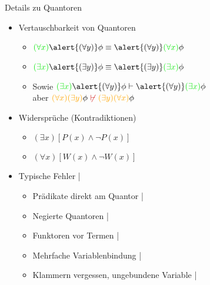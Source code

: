 \begin{frame}
  {Details zu Quantoren}
  \onslide<+->
  \begin{itemize}[<+->]
    \item Vertauschbarkeit von Quantoren
      \begin{itemize}[<+->]
        \item $\gruen{(\forall x)}\alert{(\forall y)}\phi\equiv\alert{(\forall y)}\gruen{(\forall x)}\phi$
          \Viertelzeile
        \item $\gruen{(\exists x)}\alert{(\exists y)}\phi\equiv\alert{(\exists y)}\gruen{(\exists x)}\phi$
          \Viertelzeile
        \item Sowie $\gruen{(\exists x)}\alert{(\forall y)}\phi \vdash\alert{(\forall y)}\gruen{(\exists x)}\phi$\\
          aber $\orongsch{(\forall x)(\exists y)}\phi\ \rot{\not\vdash}\ \orongsch{(\exists y)(\forall x)}\phi$
      \end{itemize}
      \Halbzeile
    \item Widersprüche (Kontradiktionen)
      \begin{itemize}[<+->]
        \item $(\exists x)[P(x)\wedge\neg P(x)]$ 
        \item $(\forall x)[W(x)\wedge \neg W(x)]$ 
      \end{itemize}
      \Halbzeile
    \item Typische Fehler | 
      \begin{itemize}[<+->]
        \item Prädikate direkt am Quantor |  
        \item Negierte Quantoren |  
        \item Funktoren vor Termen |  
        \item Mehrfache Variablenbindung | 
        \item Klammern vergessen, ungebundene Variable |  
      \end{itemize}
  \end{itemize}
\end{frame}

